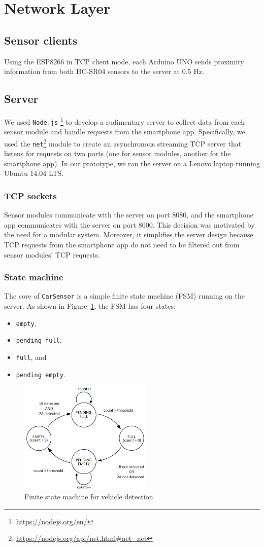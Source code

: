 \documentclass[conference]{IEEEtran}
\begin{document}
\section{Network Layer}\label{sec_network}
\subsection{Sensor clients}
Using the ESP8266 in TCP client mode, each Arduino UNO sends proximity information from both HC-SR04 sensors to the server at 0.5 Hz.
\subsection{Server}
We used \texttt{Node.js}\textsuperscript{\textregistered} \footnote{\url{https://nodejs.org/en/}} to develop a rudimentary server to collect data from each sensor module and handle requests from the smartphone app. Specifically, we used the \texttt{net}\footnote{\url{https://nodejs.org/api/net.html\#net_net}} module to create an asynchronous streaming TCP server that listens for requests on two ports (one for sensor modules, another for the smartphone app). In our prototype, we ran the server on a Lenovo laptop running Ubuntu 14.04 LTS.
\subsubsection{TCP sockets}
Sensor modules communicate with the server on port 8080, and the smartphone app communicates with the server on port 8000. This decision was motivated by the need for a modular system. Moreover, it simplifies the server design because TCP requests from the smartphone app do not need to be filtered out from sensor modules' TCP requests.
\subsubsection{State machine}
The core of \texttt{CarSensor} is a simple finite state machine (FSM) running on the server. As shown in Figure~\ref{fig_fsm}, the FSM has four states:
\begin{itemize}
\item \texttt{empty},
\item \texttt{pending full},
\item \texttt{full}, and
\item \texttt{pending empty}.
\end{itemize}
\begin{figure}[h]
	\centering
	\includegraphics[width=2.5in]{FSM.png}
	\caption{Finite state machine for vehicle detection}
	\label{fig_fsm}
\end{figure}
\end{document}
